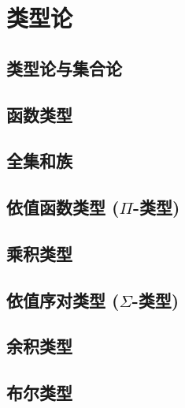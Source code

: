 \chapter{类型论}
\label{cha:typetheory}

\section{类型论与集合论}
\label{sec:types-vs-sets}


\section{函数类型}
\label{sec:function-types}


\section{全集和族}
\label{sec:universes}


\section{依值函数类型 (\texorpdfstring{$\Pi$}{Π}-类型)}
\label{sec:pi-types}


\section{乘积类型}
\label{sec:finite-product-types}


\section{依值序对类型 (\texorpdfstring{$\Sigma$}{Σ}-类型)}
\label{sec:sigma-types}


\section{余积类型}
\label{sec:coproduct-types}


\section{布尔类型}
\label{sec:type-booleans}


